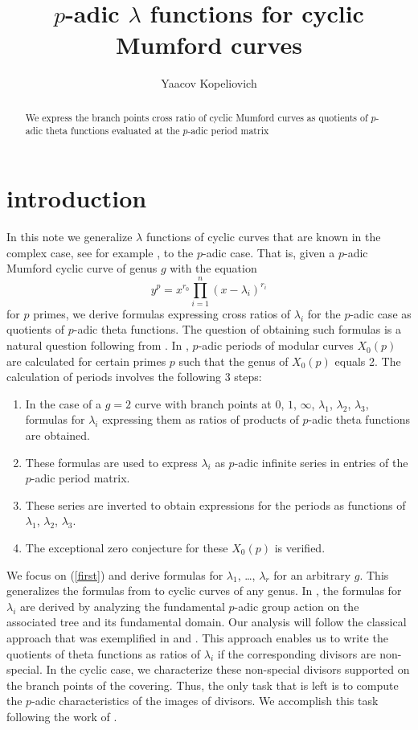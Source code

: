 \documentclass[]{amsart}
\title{$p$-adic  $\lambda$ functions for cyclic Mumford curves}
\author{Yaacov Kopeliovich}
\numberwithin{equation}{section}
\begin{document}
\maketitle{}

\begin{abstract}We express the branch points cross ratio of cyclic Mumford curves as quotients 
of $p$-adic theta functions evaluated at the $p$-adic period matrix
\end{abstract}

\section{introduction}
In this note we generalize $\lambda$ functions of cyclic curves that are known in the complex case, see for example \cite{FK980}, to the $p$-adic case. That is, given a $p$-adic Mumford cyclic curve of genus $g$ with the equation 
\begin{equation}
y^p=x^{r_0}\prod_{i=1}^{n}(x-\lambda_i)^{r_i}
\end{equation} 
for $p$ primes, we derive formulas expressing cross ratios of $\lambda_i$  for the $p$-adic case  as quotients of $p$-adic theta functions.  
The question of obtaining such formulas is a natural question following from \cite{T}. In \cite{T}, 
$p$-adic periods of modular curves $X_0(p)$ are calculated for certain primes $p$ 
such that the genus of $X_0(p)$ equals 2. The calculation of periods involves the following 3 steps: 
\begin{enumerate} 
\item In the case of a $g=2$ curve with branch points  at $0$, $1$, $\infty$, $\lambda_1$, $\lambda_2$, $\lambda_3$, 
 formulas for $\lambda_i$ expressing them as ratios of products of $p$-adic theta functions are obtained.  
\item These formulas are used to express  $\lambda_i$ as $p$-adic infinite series in entries of the $p$-adic period matrix. \label {first}
\item These series are inverted to obtain expressions for the periods as functions of $\lambda_1$, $\lambda_2$,
$\lambda_3$.
\item The exceptional zero conjecture for these $X_0(p)$ is verified.
\end{enumerate} 

We  focus on (\ref{first}) and derive formulas for $\lambda_1$, \ldots, $\lambda_{r}$ for an arbitrary $g$. 
This generalizes the formulas from \cite{T}   to cyclic curves of any genus. 
In \cite{T},  the formulas for $\lambda_i$ are derived by analyzing  the fundamental $p$-adic group action on the associated tree and its fundamental domain. Our analysis will follow the classical approach that was exemplified in \cite{FK980} and \cite{M2}. 
This approach enables us to write the quotients of theta functions as ratios of $\lambda_i$ if 
the corresponding divisors are non-special.  In the cyclic case,
we characterize these non-special divisors  supported on the branch points of the covering. 
Thus, the only task that is left is to compute the $p$-adic characteristics of the images of divisors. 
We accomplish this task following the work of \cite{V1,V2}. 
\end{document}
